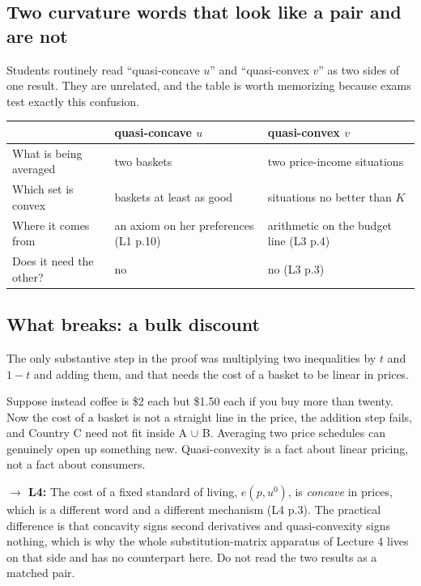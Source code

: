 \documentclass[11pt,letterpaper]{article}
\theoremstyle{definition}
\theoremstyle{plain}
\newcommand{\src}[1]{{\small\textsf{(#1)}}}
\newcommand{\fwd}[1]{\textsf{\textbf{$\rightarrow$ #1:}}}
\begin{document}
\subsection{Two curvature words that look like a pair and are not}

Students routinely read ``quasi-concave $u$'' and ``quasi-convex $v$'' as two sides of one result.
They are unrelated, and the table is worth memorizing because exams test exactly this confusion.

\begin{center}
\begin{tabular}{@{}l l l@{}}
\toprule
 & \textbf{quasi-concave $u$} & \textbf{quasi-convex $v$} \\
\midrule
What is being averaged & two baskets & two price-income situations \\
Which set is convex & baskets at least as good & situations no better than $K$ \\
Where it comes from & an axiom on her preferences \src{L1 p.10} & arithmetic on the budget line \src{L3 p.4} \\
Does it need the other? & no & no \src{L3 p.3} \\
\bottomrule
\end{tabular}
\end{center}

\subsection{What breaks: a bulk discount}

The only substantive step in the proof was multiplying two inequalities by $t$ and $1-t$ and adding
them, and that needs the cost of a basket to be linear in prices.

Suppose instead coffee is \$2 each but \$1.50 each if you buy more than twenty. Now the cost of a
basket is not a straight line in the price, the addition step fails, and Country C need not fit
inside A $\cup$ B. Averaging two price schedules can genuinely open up something new. Quasi-convexity
is a fact about linear pricing, not a fact about consumers.

\fwd{L4} The cost of a fixed standard of living, $e(p,u^0)$, is \emph{concave} in prices, which is a
different word and a different mechanism \src{L4 p.3}. The practical difference is that concavity
signs second derivatives and quasi-convexity signs nothing, which is why the whole substitution-matrix
apparatus of Lecture 4 lives on that side and has no counterpart here. Do not read the two results as
a matched pair.
\end{document}
